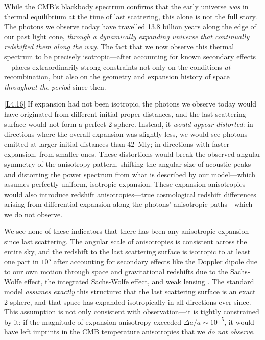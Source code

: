 \documentclass[12pt]{book}
\newcounter{logicanchor}
\newenvironment{logicanchorenv}[1]{\refstepcounter{logicanchor}\label{#1}}{}
\newcommand{\logiclink}[2]{\begin{logicanchorenv}{logic:#1}\end{logicanchorenv}\hyperref[appendix:#1]{[#1]}\xspace}
\begin{document}
While the CMB's blackbody spectrum confirms that the early universe \textit{was} in thermal equilibrium at the time of last scattering, this alone is not the full story. The photons we observe today have travelled 13.8 billion years along the edge of our past light cone, \textit{through a dynamically expanding universe that continually redshifted them along the way}. The fact that we now observe this thermal spectrum to be precisely isotropic---after accounting for known secondary effects---places extraordinarily strong constraints not only on the conditions \textit{at} recombination, but also on the geometry and expansion history of space \textit{throughout the period} since then.

\logiclink{L4.16}{} If expansion had not been isotropic, the photons we observe today would have originated from different initial proper distances, and the last scattering surface would not form a perfect 2-sphere. Instead, it \textit{would appear distorted}: in directions where the overall expansion was slightly less, we would see photons emitted at larger initial distances than 42~Mly; in directions with faster expansion, from smaller ones. These distortions would break the observed angular symmetry of the anisotropy pattern, shifting the angular size of acoustic peaks and distorting the power spectrum from what is described by our model---which assumes perfectly uniform, isotropic expansion. These expansion anisotropies would also introduce redshift anisotropies---true cosmological redshift differences arising from differential expansion along the photons' anisotropic paths---which we do not observe.

We see none of these indicators that there has been any anisotropic expansion since last scattering. The angular scale of anisotropies is consistent across the entire sky, and the redshift to the last scattering surface is isotropic to at least one part in $10^5$ after accounting for secondary effects like the Doppler dipole due to our own motion through space and gravitational redshifts due to the Sachs-Wolfe effect, the integrated Sachs-Wolfe effect, and weak lensing \cite{Sachs1967, Aghanim2020}. The standard model \textit{assumes exactly} this structure: that the last scattering surface is an exact 2-sphere, and that space has expanded isotropically in all directions ever since. 
This assumption is not only consistent with observation---it is tightly constrained by it: if the magnitude of expansion anisotropy exceeded $\Delta a / a \sim 10^{-5}$, it would have left imprints in the CMB temperature anisotropies that we \textit{do not observe}.
\end{document}
